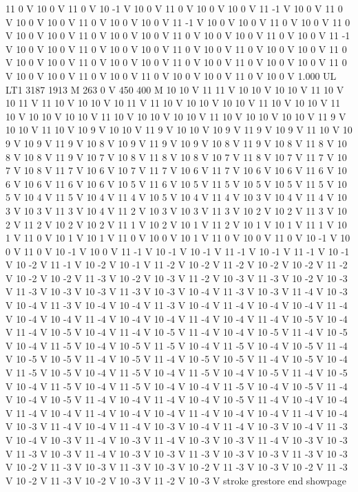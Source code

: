 {11 0 V
10 0 V
11 0 V
10 -1 V
10 0 V
11 0 V
10 0 V
10 0 V
11 -1 V
10 0 V
11 0 V
10 0 V
10 0 V
11 0 V
10 0 V
10 0 V
11 -1 V
10 0 V
10 0 V
11 0 V
10 0 V
11 0 V
10 0 V
10 0 V
11 0 V
10 0 V
10 0 V
11 0 V
10 0 V
10 0 V
11 0 V
10 0 V
11 -1 V
10 0 V
10 0 V
11 0 V
10 0 V
10 0 V
11 0 V
10 0 V
11 0 V
10 0 V
10 0 V
11 0 V
10 0 V
10 0 V
11 0 V
10 0 V
10 0 V
11 0 V
10 0 V
11 0 V
10 0 V
10 0 V
11 0 V
10 0 V
10 0 V
11 0 V
10 0 V
11 0 V
10 0 V
10 0 V
11 0 V
10 0 V
1.000 UL
LT1
3187 1913 M
263 0 V
450 400 M
10 10 V
11 11 V
10 10 V
10 10 V
11 10 V
10 11 V
11 10 V
10 10 V
10 11 V
11 10 V
10 10 V
10 10 V
11 10 V
10 10 V
11 10 V
10 10 V
10 10 V
11 10 V
10 10 V
10 10 V
11 10 V
10 10 V
10 10 V
11 9 V
10 10 V
11 10 V
10 9 V
10 10 V
11 9 V
10 10 V
10 9 V
11 9 V
10 9 V
11 10 V
10 9 V
10 9 V
11 9 V
10 8 V
10 9 V
11 9 V
10 9 V
10 8 V
11 9 V
10 8 V
11 8 V
10 8 V
10 8 V
11 9 V
10 7 V
10 8 V
11 8 V
10 8 V
10 7 V
11 8 V
10 7 V
11 7 V
10 7 V
10 8 V
11 7 V
10 6 V
10 7 V
11 7 V
10 6 V
11 7 V
10 6 V
10 6 V
11 6 V
10 6 V
10 6 V
11 6 V
10 6 V
10 5 V
11 6 V
10 5 V
11 5 V
10 5 V
10 5 V
11 5 V
10 5 V
10 4 V
11 5 V
10 4 V
11 4 V
10 5 V
10 4 V
11 4 V
10 3 V
10 4 V
11 4 V
10 3 V
10 3 V
11 3 V
10 4 V
11 2 V
10 3 V
10 3 V
11 3 V
10 2 V
10 2 V
11 3 V
10 2 V
11 2 V
10 2 V
10 2 V
11 1 V
10 2 V
10 1 V
11 2 V
10 1 V
10 1 V
11 1 V
10 1 V
11 0 V
10 1 V
10 1 V
11 0 V
10 0 V
10 1 V
11 0 V
10 0 V
11 0 V
10 -1 V
10 0 V
11 0 V
10 -1 V
10 0 V
11 -1 V
10 -1 V
10 -1 V
11 -1 V
10 -1 V
11 -1 V
10 -1 V
10 -2 V
11 -1 V
10 -2 V
10 -1 V
11 -2 V
10 -2 V
11 -2 V
10 -2 V
10 -2 V
11 -2 V
10 -2 V
10 -2 V
11 -3 V
10 -2 V
10 -3 V
11 -2 V
10 -3 V
11 -3 V
10 -2 V
10 -3 V
11 -3 V
10 -3 V
10 -3 V
11 -3 V
10 -3 V
10 -4 V
11 -3 V
10 -3 V
11 -4 V
10 -3 V
10 -4 V
11 -3 V
10 -4 V
10 -4 V
11 -3 V
10 -4 V
11 -4 V
10 -4 V
10 -4 V
11 -4 V
10 -4 V
10 -4 V
11 -4 V
10 -4 V
10 -4 V
11 -4 V
10 -4 V
11 -4 V
10 -5 V
10 -4 V
11 -4 V
10 -5 V
10 -4 V
11 -4 V
10 -5 V
11 -4 V
10 -4 V
10 -5 V
11 -4 V
10 -5 V
10 -4 V
11 -5 V
10 -4 V
10 -5 V
11 -5 V
10 -4 V
11 -5 V
10 -4 V
10 -5 V
11 -4 V
10 -5 V
10 -5 V
11 -4 V
10 -5 V
11 -4 V
10 -5 V
10 -5 V
11 -4 V
10 -5 V
10 -4 V
11 -5 V
10 -5 V
10 -4 V
11 -5 V
10 -4 V
11 -5 V
10 -4 V
10 -5 V
11 -4 V
10 -5 V
10 -4 V
11 -5 V
10 -4 V
11 -5 V
10 -4 V
10 -4 V
11 -5 V
10 -4 V
10 -5 V
11 -4 V
10 -4 V
10 -5 V
11 -4 V
10 -4 V
11 -4 V
10 -4 V
10 -5 V
11 -4 V
10 -4 V
10 -4 V
11 -4 V
10 -4 V
11 -4 V
10 -4 V
10 -4 V
11 -4 V
10 -4 V
10 -4 V
11 -4 V
10 -4 V
10 -3 V
11 -4 V
10 -4 V
11 -4 V
10 -3 V
10 -4 V
11 -4 V
10 -3 V
10 -4 V
11 -3 V
10 -4 V
10 -3 V
11 -4 V
10 -3 V
11 -4 V
10 -3 V
10 -3 V
11 -4 V
10 -3 V
10 -3 V
11 -3 V
10 -3 V
11 -4 V
10 -3 V
10 -3 V
11 -3 V
10 -3 V
10 -3 V
11 -3 V
10 -3 V
10 -2 V
11 -3 V
10 -3 V
11 -3 V
10 -3 V
10 -2 V
11 -3 V
10 -3 V
10 -2 V
11 -3 V
10 -2 V
11 -3 V
10 -2 V
10 -3 V
11 -2 V
10 -3 V
stroke
grestore
end
showpage
}
